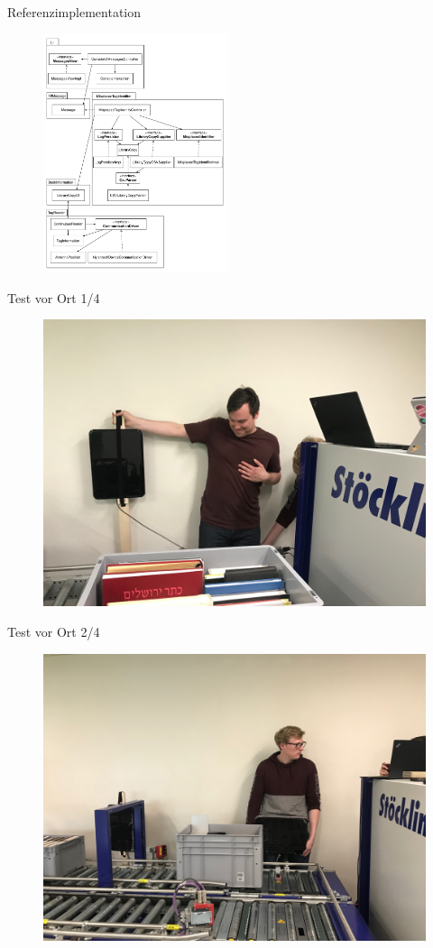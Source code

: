 \documentclass{beamer}
\begin{document}
\begin{frame}{Referenzimplementation}
\begin{figure}[tbh!]
    \centering
    \includegraphics[height=7cm]{img/TestApplikation}
    \label{fig:testapplikation}
\end{figure}
\end{frame}
\begin{frame}{Test vor Ort 1/4}
\begin{figure}[tbh!]
    \centering
    \includegraphics[width=0.8\linewidth]{img/Versuchsaufbau_02}    \label{fig:versuchsaufbau02}
\end{figure}
\end{frame}
\begin{frame}{Test vor Ort 2/4}
\begin{figure}[tbh!]
    \centering
    \includegraphics[width=0.8\linewidth]{img/Versuchsaufbau_03}    \label{fig:versuchsaufbau03}
\end{figure}
\end{frame}
\end{document}
